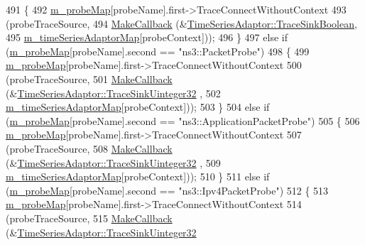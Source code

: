 \begin{DoxyCode}
491     \{
492       \hyperlink{classns3_1_1FileHelper_a69184708162929e89458eed5956791e1}{m\_probeMap}[probeName].first->TraceConnectWithoutContext
493         (probeTraceSource,
494         \hyperlink{group__makecallbackmemptr_ga9376283685aa99d204048d6a4b7610a4}{MakeCallback} (&\hyperlink{classns3_1_1TimeSeriesAdaptor_a85bb6303947154ffeefb4ab5c96c7bc3}{TimeSeriesAdaptor::TraceSinkBoolean},
495                       \hyperlink{classns3_1_1FileHelper_a2e55bee0c776ab5f14cc2d4dfbfcc361}{m\_timeSeriesAdaptorMap}[probeContext]));
496     \}
497   \textcolor{keywordflow}{else} \textcolor{keywordflow}{if} (\hyperlink{classns3_1_1FileHelper_a69184708162929e89458eed5956791e1}{m\_probeMap}[probeName].second == \textcolor{stringliteral}{"ns3::PacketProbe"})
498     \{
499       \hyperlink{classns3_1_1FileHelper_a69184708162929e89458eed5956791e1}{m\_probeMap}[probeName].first->TraceConnectWithoutContext
500         (probeTraceSource,
501         \hyperlink{group__makecallbackmemptr_ga9376283685aa99d204048d6a4b7610a4}{MakeCallback} (&\hyperlink{classns3_1_1TimeSeriesAdaptor_add04eee090a86dc859b2415710c85b30}{TimeSeriesAdaptor::TraceSinkUinteger32}
      ,
502                       \hyperlink{classns3_1_1FileHelper_a2e55bee0c776ab5f14cc2d4dfbfcc361}{m\_timeSeriesAdaptorMap}[probeContext]));
503     \}
504   \textcolor{keywordflow}{else} \textcolor{keywordflow}{if} (\hyperlink{classns3_1_1FileHelper_a69184708162929e89458eed5956791e1}{m\_probeMap}[probeName].second == \textcolor{stringliteral}{"ns3::ApplicationPacketProbe"})
505     \{
506       \hyperlink{classns3_1_1FileHelper_a69184708162929e89458eed5956791e1}{m\_probeMap}[probeName].first->TraceConnectWithoutContext
507         (probeTraceSource,
508         \hyperlink{group__makecallbackmemptr_ga9376283685aa99d204048d6a4b7610a4}{MakeCallback} (&\hyperlink{classns3_1_1TimeSeriesAdaptor_add04eee090a86dc859b2415710c85b30}{TimeSeriesAdaptor::TraceSinkUinteger32}
      ,
509                       \hyperlink{classns3_1_1FileHelper_a2e55bee0c776ab5f14cc2d4dfbfcc361}{m\_timeSeriesAdaptorMap}[probeContext]));
510     \}
511   \textcolor{keywordflow}{else} \textcolor{keywordflow}{if} (\hyperlink{classns3_1_1FileHelper_a69184708162929e89458eed5956791e1}{m\_probeMap}[probeName].second == \textcolor{stringliteral}{"ns3::Ipv4PacketProbe"})
512     \{
513       \hyperlink{classns3_1_1FileHelper_a69184708162929e89458eed5956791e1}{m\_probeMap}[probeName].first->TraceConnectWithoutContext
514         (probeTraceSource,
515         \hyperlink{group__makecallbackmemptr_ga9376283685aa99d204048d6a4b7610a4}{MakeCallback} (&\hyperlink{classns3_1_1TimeSeriesAdaptor_add04eee090a86dc859b2415710c85b30}{TimeSeriesAdaptor::TraceSinkUinteger32}

\end{DoxyCode}
